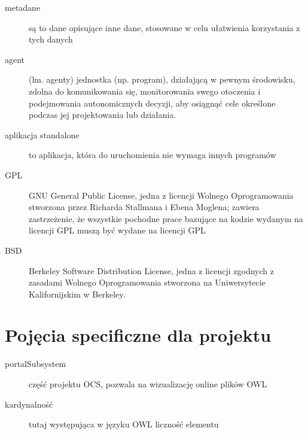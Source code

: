 \documentclass[a4paper,10pt]{article}
\begin{document}
\begin{description}
	\item[metadane] są to dane opisujące inne dane, stosowane w celu ułatwienia korzystania z tych danych
	\item[agent] (lm. agenty) jednostka (np. program), działającą w pewnym środowisku, zdolna do komunikowania się, monitorowania swego otoczenia i podejmowania autonomicznych decyzji, aby osiągnąć cele określone podczas jej projektowania lub działania.
	\item[aplikacja standalone] to aplikacja, która do uruchomienia nie wymaga innych programów
	\item[GPL] GNU General Public License, jedna z licencji Wolnego Oprogramowania stworzona przez Richarda Stallmana i Ebena Moglena; zawiera zastrzeżenie, że wszystkie pochodne prace bazujące na kodzie wydanym na licencji GPL muszą być wydane na licencji GPL 
	\item[BSD] Berkeley Software Distribution License, jedna z licencji zgodnych z zasadami Wolnego Oprogramowania stworzona na Uniwersytecie Kalifornijskim w Berkeley.
\end{description}



\section{Pojęcia specificzne dla projektu}
\begin{description}
 	\item[portalSubsystem] część projektu OCS, pozwala na wizualizację online plików OWL
 	\item[kardynalność] tutaj występująca w języku OWL liczność elementu 
\end{description}



\clearpage
{}
{}

\end{document}

